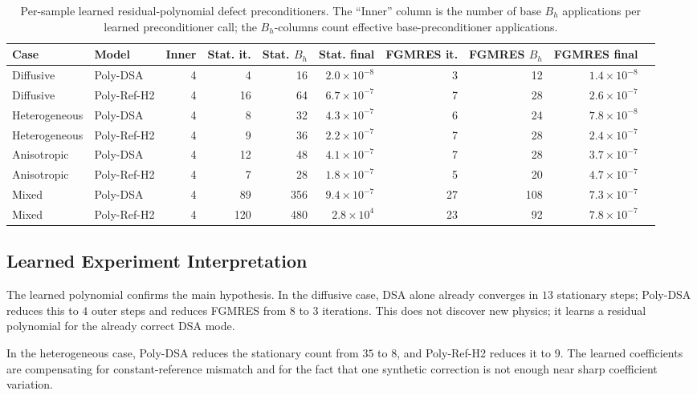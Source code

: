 \documentclass[11pt]{article}
\begin{document}
\begin{table}[t]
\centering
\scriptsize
\begin{tabular}{llrrrrrrrr}
\toprule
Case & Model & Inner & Stat. it. & Stat. \(B_h\) & Stat. final & FGMRES it. & FGMRES \(B_h\) & FGMRES final\\
\midrule
Diffusive & Poly-DSA & 4 & 4 & 16 & \(2.0{\times}10^{-8}\) & 3 & 12 & \(1.4{\times}10^{-8}\)\\
Diffusive & Poly-Ref-H2 & 4 & 16 & 64 & \(6.7{\times}10^{-7}\) & 7 & 28 & \(2.6{\times}10^{-7}\)\\
Heterogeneous & Poly-DSA & 4 & 8 & 32 & \(4.3{\times}10^{-7}\) & 6 & 24 & \(7.8{\times}10^{-8}\)\\
Heterogeneous & Poly-Ref-H2 & 4 & 9 & 36 & \(2.2{\times}10^{-7}\) & 7 & 28 & \(2.4{\times}10^{-7}\)\\
Anisotropic & Poly-DSA & 4 & 12 & 48 & \(4.1{\times}10^{-7}\) & 7 & 28 & \(3.7{\times}10^{-7}\)\\
Anisotropic & Poly-Ref-H2 & 4 & 7 & 28 & \(1.8{\times}10^{-7}\) & 5 & 20 & \(4.7{\times}10^{-7}\)\\
Mixed & Poly-DSA & 4 & 89 & 356 & \(9.4{\times}10^{-7}\) & 27 & 108 & \(7.3{\times}10^{-7}\)\\
Mixed & Poly-Ref-H2 & 4 & 120 & 480 & \(2.8{\times}10^{4}\) & 23 & 92 & \(7.8{\times}10^{-7}\)\\
\bottomrule
\end{tabular}
\caption{Per-sample learned residual-polynomial defect preconditioners.  The
``Inner'' column is the number of base \(B_h\) applications per learned
preconditioner call; the \(B_h\)-columns count effective base-preconditioner
applications.}
\label{tab:rte-learned-hard-cases}
\end{table}

\subsection{Learned Experiment Interpretation}

The learned polynomial confirms the main hypothesis.  In the diffusive case,
DSA alone already converges in \(13\) stationary steps; Poly-DSA reduces this
to \(4\) outer steps and reduces FGMRES from \(8\) to \(3\) iterations.  This
does not discover new physics; it learns a residual polynomial for the already
correct DSA mode.

In the heterogeneous case, Poly-DSA reduces the stationary count from \(35\) to
\(8\), and Poly-Ref-H2 reduces it to \(9\).  The learned coefficients are
compensating for constant-reference mismatch and for the fact that one
synthetic correction is not enough near sharp coefficient variation.
\end{document}
